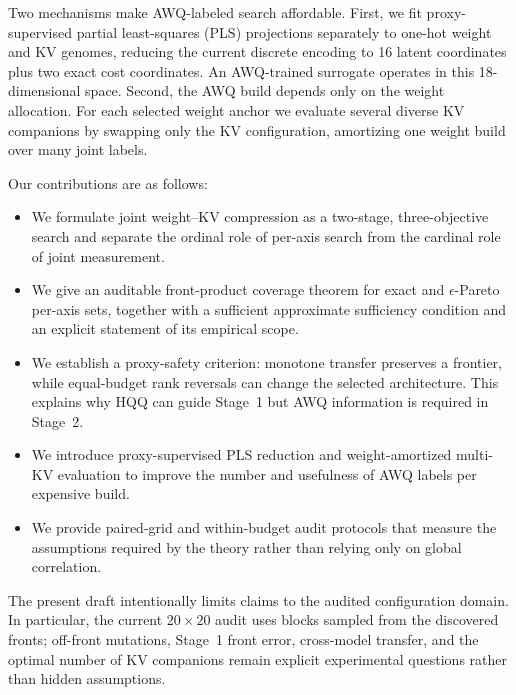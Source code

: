 Two mechanisms make AWQ-labeled search affordable.  First, we fit
proxy-supervised partial least-squares (PLS) projections separately to one-hot
weight and KV genomes, reducing the current discrete encoding to 16 latent
coordinates plus two exact cost coordinates.  An AWQ-trained surrogate operates
in this 18-dimensional space.  Second, the AWQ build depends only on the weight
allocation.  For each selected weight anchor we evaluate several diverse KV
companions by swapping only the KV configuration, amortizing one weight build
over many joint labels.

Our contributions are as follows:

\begin{itemize}[leftmargin=*]
    \item We formulate joint weight--KV compression as a two-stage,
    three-objective search and separate the ordinal role of per-axis search from
    the cardinal role of joint measurement.
    \item We give an auditable front-product coverage theorem for exact and
    $\epsilon$-Pareto per-axis sets, together with a sufficient approximate
    sufficiency condition and an explicit statement of its empirical scope.
    \item We establish a proxy-safety criterion: monotone transfer preserves a
    frontier, while equal-budget rank reversals can change the selected
    architecture.  This explains why HQQ can guide Stage~1 but AWQ information
    is required in Stage~2.
    \item We introduce proxy-supervised PLS reduction and weight-amortized
    multi-KV evaluation to improve the number and usefulness of AWQ labels per
    expensive build.
    \item We provide paired-grid and within-budget audit protocols that measure
    the assumptions required by the theory rather than relying only on global
    correlation.
\end{itemize}

The present draft intentionally limits claims to the audited configuration
domain.  In particular, the current $20\times20$ audit uses blocks sampled from
the discovered fronts; off-front mutations, Stage~1 front error, cross-model
transfer, and the optimal number of KV companions remain explicit experimental
questions rather than hidden assumptions.
